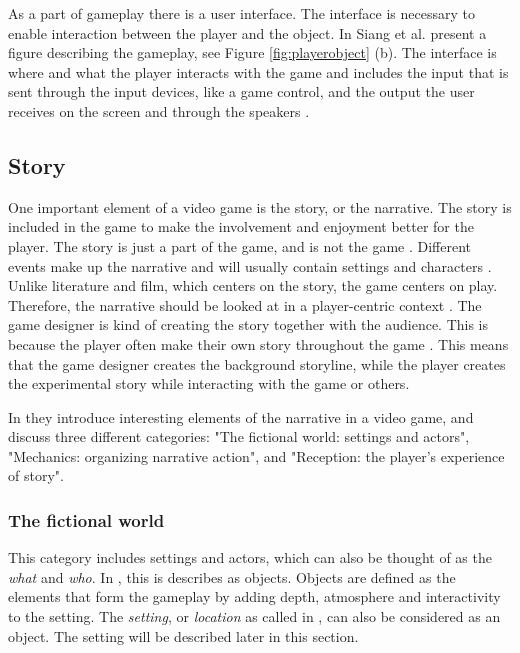 As a part of gameplay there is a user interface. The interface is necessary to enable interaction between the player and the object. In \cite{umlapproach} Siang et al. present a figure describing the gameplay, see Figure \ref{fig:playerobject} (b). The interface is where and what the player interacts with the game and includes the input that is sent through the input devices, like a game control, and the output the user receives on the screen and through the speakers \cite{umlapproach}.

\subsection{Story}
One important element of a video game is the story, or the narrative. The story is included in the game to make the involvement and enjoyment better for the player. The story is just a part of the game, and is not the game \cite{umlapproach}.  Different events make up the narrative and will usually contain settings and characters \cite{understandingvg}. Unlike literature and film, which centers on the story, the game centers on play. Therefore, the narrative should be looked at in a player-centric context \cite{gametheory}. The game designer is kind of creating the story together with the audience. This is because the player often make their own story throughout the game \cite{umlapproach}. This means that the game designer creates the background storyline, while the player creates the experimental story while interacting with the game or others. 

In \cite{understandingvg} they introduce interesting elements of the narrative in a video game, and discuss three different categories: "The fictional world: settings and actors", "Mechanics: organizing narrative action", and "Reception: the player's experience of story".

\subsubsection{The fictional world}
\label{subsub:fictionalworld}
This category includes settings and actors, which can also be thought of as the \emph{what} and \emph{who}. In \cite{beram}, this is describes as objects. Objects are defined as the elements that form the gameplay by adding depth, atmosphere and interactivity to the setting. The \emph{setting}, or \emph{location} as called in \cite{beram}, can also be considered as an object. The setting will be described later in this section.

